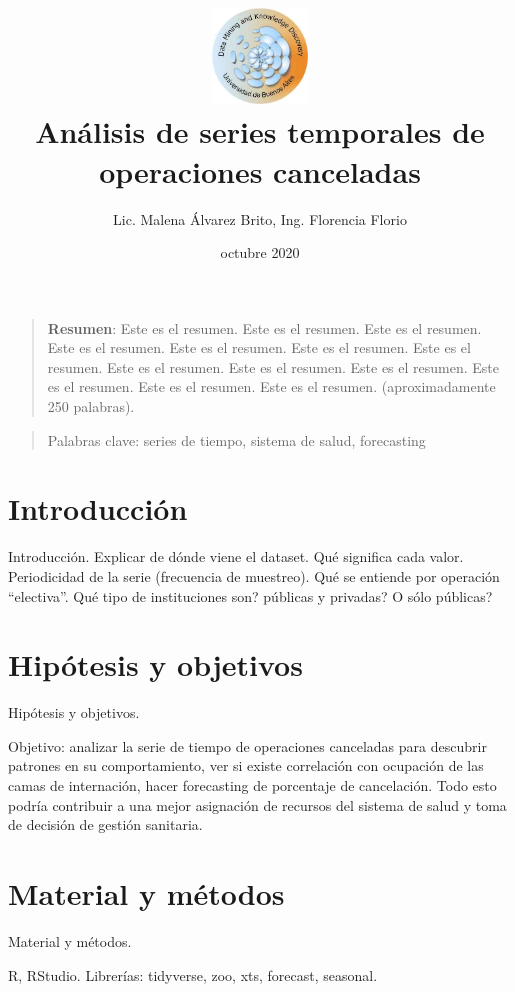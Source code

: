 \documentclass[
]{article}
\title{\includegraphics[width=1in,height=\textheight]{logo_dm_uba.png}\\
Análisis de series temporales de operaciones canceladas}
\author{Lic. Malena Álvarez Brito, Ing. Florencia Florio}
\date{octubre 2020}
\begin{document}
\maketitle

\begin{quote}
\textbf{Resumen}: Este es el resumen. Este es el resumen. Este es el
resumen. Este es el resumen. Este es el resumen. Este es el resumen.
Este es el resumen. Este es el resumen. Este es el resumen. Este es el
resumen. Este es el resumen. Este es el resumen. Este es el resumen.
(aproximadamente 250 palabras).
\end{quote}

\begin{quote}
Palabras clave: series de tiempo, sistema de salud, forecasting
\end{quote}

\hypertarget{introducciuxf3n}{%
\section{Introducción}\label{introducciuxf3n}}

Introducción. Explicar de dónde viene el dataset. Qué significa cada
valor. Periodicidad de la serie (frecuencia de muestreo). Qué se
entiende por operación ``electiva''. Qué tipo de instituciones son?
públicas y privadas? O sólo públicas?

\hypertarget{hipuxf3tesis-y-objetivos}{%
\section{Hipótesis y objetivos}\label{hipuxf3tesis-y-objetivos}}

Hipótesis y objetivos.

Objetivo: analizar la serie de tiempo de operaciones canceladas para
descubrir patrones en su comportamiento, ver si existe correlación con
ocupación de las camas de internación, hacer forecasting de porcentaje
de cancelación. Todo esto podría contribuir a una mejor asignación de
recursos del sistema de salud y toma de decisión de gestión sanitaria.

\hypertarget{material-y-muxe9todos}{%
\section{Material y métodos}\label{material-y-muxe9todos}}

Material y métodos.

R, RStudio. Librerías: tidyverse, zoo, xts, forecast, seasonal.
\end{document}

